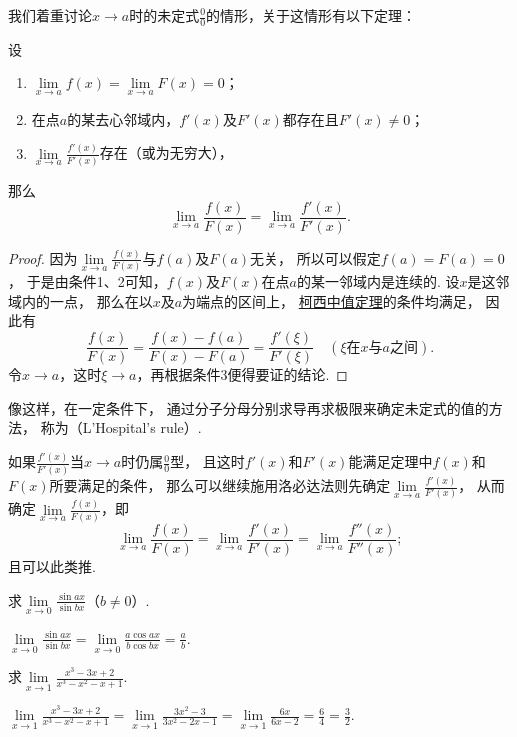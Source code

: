 我们着重讨论\(x \to a\)时的未定式\(\frac{0}{0}\)的情形，关于这情形有以下定理：
\begin{theorem}\label{theorem:微分中值定理.洛必达法则1}
设\begin{enumerate}
	\item \(\lim\limits_{x\to a} f(x) = \lim\limits_{x\to a} F(x) = 0\)；
	\item 在点\(a\)的某去心邻域内，\(f'(x)\)及\(F'(x)\)都存在且\(F'(x) \neq 0\)；
	\item \(\lim\limits_{x \to a} \frac{f'(x)}{F'(x)}\)存在（或为无穷大），%
\end{enumerate}
那么\[
	\lim\limits_{x \to a} \frac{f(x)}{F(x)}
	= \lim\limits_{x \to a} \frac{f'(x)}{F'(x)}.
\]
\begin{proof}
因为\(\lim\limits_{x\to a} \frac{f(x)}{F(x)}\)与\(f(a)\)及\(F(a)\)无关，
所以可以假定\(f(a)=F(a)=0\)，
于是由条件1、2可知，\(f(x)\)及\(F(x)\)在点\(a\)的某一邻域内是连续的.
设\(x\)是这邻域内的一点，
那么在以\(x\)及\(a\)为端点的区间上，%
\hyperref[theorem:微分中值定理.柯西中值定理]{柯西中值定理}的条件均满足，
因此有\[
	\frac{f(x)}{F(x)}
	= \frac{f(x)-f(a)}{F(x)-F(a)}
	= \frac{f'(\xi)}{F'(\xi)}
	\quad(\text{\(\xi\)在\(x\)与\(a\)之间}).
\]
令\(x \to a\)，这时\(\xi \to a\)，再根据条件3便得要证的结论.
\end{proof}
\end{theorem}
像这样，在一定条件下，
通过分子分母分别求导再求极限来确定未定式的值的方法，
称为（L'Hospital's rule）.

如果\(\frac{f'(x)}{F'(x)}\)当\(x \to a\)时仍属\(\frac{0}{0}\)型，
且这时\(f'(x)\)和\(F'(x)\)能满足定理中\(f(x)\)和\(F(x)\)所要满足的条件，
那么可以继续施用洛必达法则先确定\(\lim\limits_{x \to a} \frac{f'(x)}{F'(x)}\)，
从而确定\(\lim\limits_{x \to a} \frac{f(x)}{F(x)}\)，即\[
	\lim\limits_{x \to a} \frac{f(x)}{F(x)}
	= \lim\limits_{x \to a} \frac{f'(x)}{F'(x)}
	= \lim\limits_{x \to a} \frac{f''(x)}{F''(x)};
\]
且可以此类推.

\begin{example}
\def\l{\lim\limits_{x\to0}}
\def\a{\l\frac{\sin ax}{\sin bx}}
求\(\a\)（\(b \neq 0\)）.
\begin{solution}
\(\a = \l\frac{a \cos ax}{b \cos bx} = \frac{a}{b}\).
\end{solution}
\end{example}

\begin{example}
\def\l{\lim\limits_{x\to1}}
\def\a{\l\frac{x^3-3x+2}{x^3-x^2-x+1}}
求\(\a\).
\begin{solution}
\(\a = \l\frac{3x^2-3}{3x^2-2x-1} = \l\frac{6x}{6x-2} = \frac{6}{4} = \frac{3}{2}\).
\end{solution}
\end{example}

